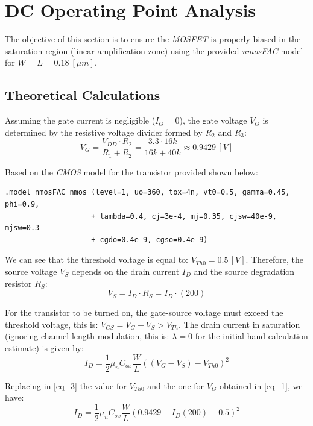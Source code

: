 \documentclass[12pt,a4paper]{article}
\begin{document}
\section{DC Operating Point Analysis}                           \label{sec_2}
The objective of this section is to ensure the \textit{MOSFET} is properly biased in the saturation region (linear amplification zone) using the provided \textit{nmosFAC} model for $W = L = 0.18 \ [\mu m]$. 


\subsection{Theoretical Calculations}                           \label{sec_2.1}
Assuming the gate current is negligible ($I_{G} = 0$), the gate voltage $V_{G}$ is determined by the resistive voltage divider formed by $R_2$ and $R_3$:
\begin{equation}
    V_{G} = \frac{V_{DD} \cdot R_{2}}{R_{1} + R_{2}} = \frac{3.3 \cdot 16k}{16k + 40k} \approx 0.9429 \, [V]
    \label{eq_1}
\end{equation}

Based on the \textit{CMOS} model for the transistor provided shown below:
\begin{verbatim}
.model nmosFAC nmos (level=1, uo=360, tox=4n, vt0=0.5, gamma=0.45, phi=0.9, 
                    + lambda=0.4, cj=3e-4, mj=0.35, cjsw=40e-9, mjsw=0.3
                    + cgdo=0.4e-9, cgso=0.4e-9)
\end{verbatim}

We can see that the threshold voltage is equal to: $V_{Th0} = 0.5 \, [V]$. Therefore, the source voltage $V_{S}$ depends on the drain current $I_{D}$ and the source degradation resistor $R_{S}$:
\begin{equation}
    V_{S} = I_{D} \cdot R_{S} = I_D \cdot (200)
    \label{eq_2}
\end{equation}

For the transistor to be turned on, the gate-source voltage must exceed the threshold voltage, this is: $V_{GS} = V_{G} - V_{S} > V_{Th}$. The drain current in saturation (ignoring channel-length modulation, this is: $\lambda = 0$ for the initial hand-calculation estimate) is given by:
\begin{equation}
    I_{D} = \frac{1}{2} \mu_{n} C_{ox} \frac{W}{L} ((V_{G} - V_{S}) - V_{Th0})^{2}
    \label{eq_3}
\end{equation}

Replacing in \autoref{eq_3} the value for $V_{Th0}$ and the one for $V_{G}$ obtained in \autoref{eq_1}, we have:
\begin{equation}
    I_{D} = \frac{1}{2} \mu_{n} C_{ox} \frac{W}{L} (0.9429 - I_D(200) - 0.5)^{2}
    \label{eq_4}
\end{equation}
\end{document}
